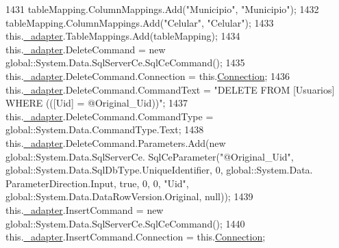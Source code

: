 \begin{DoxyCode}
1431             tableMapping.ColumnMappings.Add(\textcolor{stringliteral}{"Municipio"}, \textcolor{stringliteral}{"Municipio"});
1432             tableMapping.ColumnMappings.Add(\textcolor{stringliteral}{"Celular"}, \textcolor{stringliteral}{"Celular"});
1433             this.\hyperlink{class_proyecto___integrador__3_1_1ds_usuarios_table_adapters_1_1_usuarios_table_adapter_ab48b9b83ce2db01dbbc83ad45b428a80}{\_adapter}.TableMappings.Add(tableMapping);
1434             this.\hyperlink{class_proyecto___integrador__3_1_1ds_usuarios_table_adapters_1_1_usuarios_table_adapter_ab48b9b83ce2db01dbbc83ad45b428a80}{\_adapter}.DeleteCommand = \textcolor{keyword}{new} global::System.Data.SqlServerCe.SqlCeCommand();
1435             this.\hyperlink{class_proyecto___integrador__3_1_1ds_usuarios_table_adapters_1_1_usuarios_table_adapter_ab48b9b83ce2db01dbbc83ad45b428a80}{\_adapter}.DeleteCommand.Connection = this.\hyperlink{class_proyecto___integrador__3_1_1ds_usuarios_table_adapters_1_1_usuarios_table_adapter_a84b2a5b2b50b633d359dc7a29ce2e439}{Connection};
1436             this.\hyperlink{class_proyecto___integrador__3_1_1ds_usuarios_table_adapters_1_1_usuarios_table_adapter_ab48b9b83ce2db01dbbc83ad45b428a80}{\_adapter}.DeleteCommand.CommandText = \textcolor{stringliteral}{"DELETE FROM [Usuarios] WHERE (([Uid] =
       @Original\_Uid))"};
1437             this.\hyperlink{class_proyecto___integrador__3_1_1ds_usuarios_table_adapters_1_1_usuarios_table_adapter_ab48b9b83ce2db01dbbc83ad45b428a80}{\_adapter}.DeleteCommand.CommandType = global::System.Data.CommandType.Text;
1438             this.\hyperlink{class_proyecto___integrador__3_1_1ds_usuarios_table_adapters_1_1_usuarios_table_adapter_ab48b9b83ce2db01dbbc83ad45b428a80}{\_adapter}.DeleteCommand.Parameters.Add(\textcolor{keyword}{new} global::System.Data.SqlServerCe.
      SqlCeParameter(\textcolor{stringliteral}{"@Original\_Uid"}, global::System.Data.SqlDbType.UniqueIdentifier, 0, global::System.Data.
      ParameterDirection.Input, \textcolor{keyword}{true}, 0, 0, \textcolor{stringliteral}{"Uid"}, global::System.Data.DataRowVersion.Original, null));
1439             this.\hyperlink{class_proyecto___integrador__3_1_1ds_usuarios_table_adapters_1_1_usuarios_table_adapter_ab48b9b83ce2db01dbbc83ad45b428a80}{\_adapter}.InsertCommand = \textcolor{keyword}{new} global::System.Data.SqlServerCe.SqlCeCommand();
1440             this.\hyperlink{class_proyecto___integrador__3_1_1ds_usuarios_table_adapters_1_1_usuarios_table_adapter_ab48b9b83ce2db01dbbc83ad45b428a80}{\_adapter}.InsertCommand.Connection = this.\hyperlink{class_proyecto___integrador__3_1_1ds_usuarios_table_adapters_1_1_usuarios_table_adapter_a84b2a5b2b50b633d359dc7a29ce2e439}{Connection};

\end{DoxyCode}
